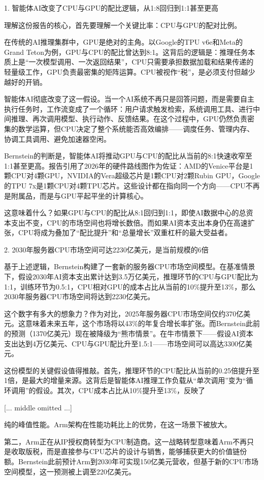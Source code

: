 \documentclass[11pt]{ctexart}
\begin{document}
1. 智能体AI改变了CPU与GPU的配比逻辑，从1:8回归到1:1甚至更高

理解这份报告的核心，首先要理解一个关键比率：CPU与GPU的配对比例。

在传统的AI推理集群中，GPU是绝对的主角。以Google的TPU v6e和Meta的Grand Teton为例，GPU与CPU的配比曾达到8:1。这背后的逻辑是：推理任务本质上是“一次模型调用、一次返回结果”，CPU只需要承担数据加载和结果传递的轻量级工作，GPU负责最密集的矩阵运算。CPU被视作“税”，是必须支付但越少越好的开销。

智能体AI彻底改变了这一假设。当一个AI系统不再只是回答问题，而是需要自主执行任务时，工作流变成了一个循环：用户请求触发检索，系统调用工具、进行中间推理、再次调用模型、执行动作、反馈结果。在这个过程中，GPU仍然负责密集的数学运算，但CPU决定了整个系统能否高效编排——调度任务、管理内存、协调工具调用、避免加速器空闲。

Bernstein的判断是，智能体AI将推动GPU与CPU的配比从当前的8:1快速收窄至1:1甚至更高。报告引用了2026年的硬件路线图作为佐证：AMD的Venice平台是1颗CPU对4颗GPU，NVIDIA的Vera超级芯片是1颗CPU对2颗Rubin GPU，Google的TPU 7x是1颗CPU对4颗TPU芯片。这些设计都在指向同一个方向——CPU不再是附属品，而是与GPU平起平坐的计算核心。

这意味着什么？如果GPU与CPU的配比从8:1回归到1:1，即使AI数据中心的总资本支出不变，CPU的市场空间也将增长数倍。而如果AI资本支出本身仍在高速扩张，CPU将成为叠加了“配比提升”和“总量增长”双重杠杆的最大受益者。

2. 2030年服务器CPU市场空间可达2230亿美元，是当前规模的6倍

基于上述逻辑，Bernstein构建了一套新的服务器CPU市场空间模型。在基准情景下，假设2030年AI资本支出累计达到3.5万亿美元，推理环节的CPU与GPU配比为1:1，训练环节为0.5:1，CPU相对GPU的成本占比从当前的10\%提升至13\%，那么2030年服务器CPU市场空间将达到2230亿美元。

这个数字有多大的想象力？作为对比，2025年服务器CPU市场空间仅约370亿美元。这意味着未来五年，这个市场将以43\%的年复合增长率扩张。而Bernstein此前的预测（1370亿美元）现在被降级为“熊市情景”。在牛市情景下——假设AI资本支出达到4万亿美元、CPU与GPU配比升至1.5:1——市场空间可以高达3300亿美元。

这份模型的关键假设值得推敲。首先，推理环节的CPU配比从当前的0.25倍提升至1倍，是最大的增量来源。这背后是智能体AI推理工作负载从“单次调用”变为“循环调用”的假设。其次，CPU成本占比从10\%提升至13\%，反映了

[... middle omitted ...]

纯的峰值性能。Arm架构在性能功耗比上的优势，在这一场景下被放大。

第二，Arm正在从IP授权商转型为CPU制造商。这一战略转型意味着Arm不再只是收取版税，而是直接参与CPU芯片的设计与销售，能够捕获更大的价值链份额。Bernstein此前预计Arm到2030年可实现150亿美元营收，但基于新的CPU市场空间模型，这一预测被上调至220亿美元。
\end{document}
